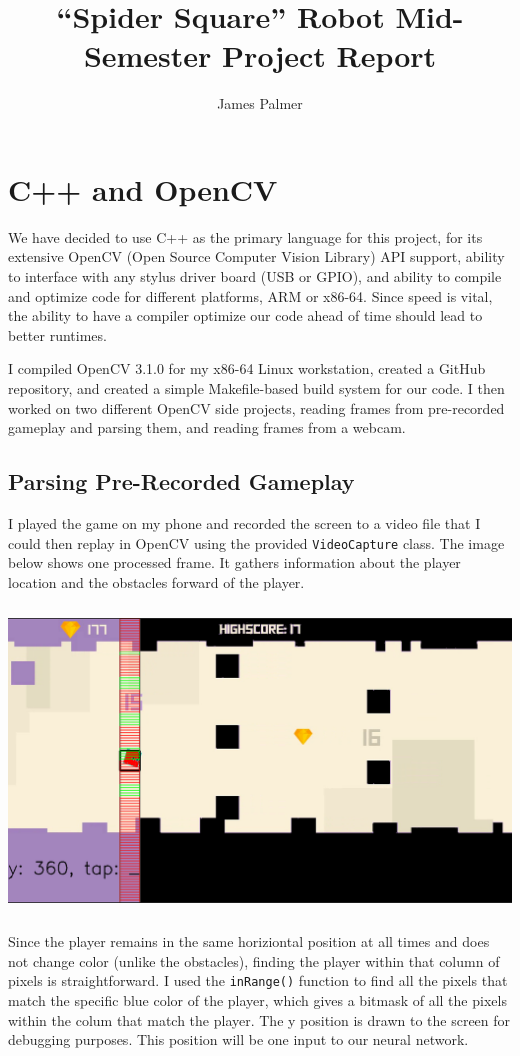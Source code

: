 \documentclass[a4paper,12pt]{article}
\begin{document}
\title{``Spider Square'' Robot Mid-Semester Project Report}
\author{James Palmer}

\section*{C++ and OpenCV}
We have decided to use C++ as the primary language for this project, for its
extensive OpenCV (Open Source Computer Vision Library) API support, ability to
interface with any stylus driver board (USB or GPIO), and ability to compile
and optimize code for different platforms, ARM or x86-64. Since speed is vital,
the ability to have a compiler optimize our code ahead of time should lead to
better runtimes.

I compiled OpenCV 3.1.0 for my x86-64 Linux workstation, created a GitHub
repository, and created a simple Makefile-based build system for our code. I
then worked on two different OpenCV side projects, reading frames from
pre-recorded gameplay and parsing them, and reading frames from a webcam.

\subsection*{Parsing Pre-Recorded Gameplay}
I played the game on my phone and recorded the screen to a video file that I 
could then replay in OpenCV using the provided \texttt{VideoCapture} class. The
image below shows one processed frame. It gathers information about the player
location and the obstacles forward of the player. \\

\centerline{\includegraphics[height=3.2in]{f1.png}}

Since the player remains in the same horiziontal position at all times and does
not change color (unlike the obstacles), finding the player within that column
of pixels is straightforward. I used the \texttt{inRange()} function to find
all the pixels that match the specific blue color of the player, which gives a
bitmask of all the pixels within the colum that match the player. The y position
is drawn to the screen for debugging purposes. This position will be one input
to our neural network.
\end{document}
